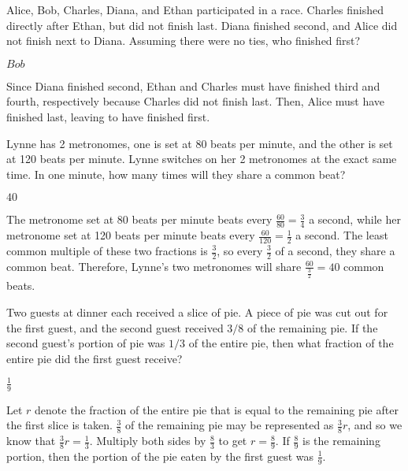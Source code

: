 \documentclass[11pt]{article}
\begin{document}
\begin{problem}
Alice, Bob, Charles, Diana, and Ethan participated in a race. Charles finished directly after Ethan, but did not finish last. Diana finished second, and Alice did not finish next to Diana. Assuming there were no ties, who finished first?
\end{problem}
\begin{answer}
$\boxed{Bob}$
\end{answer}
\begin{solution}
Since Diana finished second, Ethan and Charles must have finished third and fourth, respectively because Charles did not finish last. Then, Alice must have finished last, leaving  to have finished first.
\end{solution}

\begin{problem}
Lynne has 2 metronomes, one is set at 80 beats per minute, and the other is set at 120 beats per minute. Lynne switches on her 2 metronomes at the exact same time. In one minute, how many times will they share a common beat?
\end{problem}
\begin{answer}
$\boxed{40}$
\end{answer}
\begin{solution}
The metronome set at 80 beats per minute beats every $\frac{60}{80} = \frac{3}{4}$ a second, while her metronome set at 120 beats per minute beats every $\frac{60}{120} = \frac{1}{2}$ a second. The least common multiple of these two fractions is $\frac{3}{2}$, so every $\frac{3}{2}$ of a second, they share a common beat. Therefore, Lynne's two metronomes will share $\frac{60}{\frac{3}{2}} = \boxed{40}$ common beats.
\end{solution}

\begin{problem}
Two guests at dinner each received a slice of pie. A piece of pie was cut out for the first guest, and the second guest received $3/8$ of the remaining pie. If the second guest’s portion of pie was $1/3$ of the entire pie, then what fraction of the entire pie did the first guest receive?
\end{problem}
\begin{answer}
$\boxed{\frac{1}{9}}$
\end{answer}
\begin{solution}
Let $r$ denote the fraction of the entire pie that is equal to the remaining pie after the first slice is taken. $\frac{3}{8}$ of the remaining pie may be represented as $\frac{3}{8}r$, and so we know that $\frac{3}{8}r = \frac{1}{3}$. Multiply both sides by $\frac{8}{3}$ to get $r = \frac{8}{9}$. If $\frac{8}{9}$ is the remaining portion, then the portion of the pie eaten by the first guest was $\boxed{\frac{1}{9}}$.
\end{solution}
\end{document}

